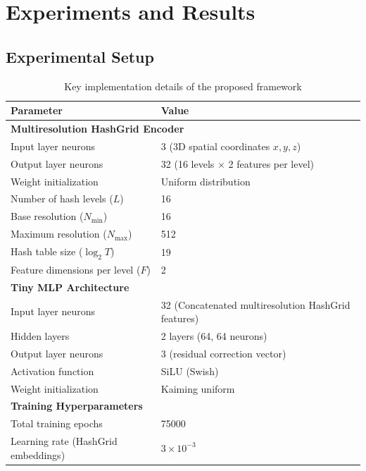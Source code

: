 \documentclass[%
 aip,
 amsmath,amssymb,
 reprint,%
nobibnotes,
]{revtex4-1}
\begin{document}
\section{\label{sec:level2}Experiments and Results}

\subsection{\label{sec:level2-1}Experimental Setup}

\begin{table}[t]
    \centering
    \caption{Key implementation details of the proposed framework}
    \label{tab:hyperparameters}
    \begin{tabular}{ll}
        \toprule
        \textbf{Parameter} & \textbf{Value} \\
        \midrule
        \multicolumn{2}{l}{\textbf{Multiresolution HashGrid Encoder}} \\
        Input layer neurons & 3 (3D spatial coordinates $x, y, z$)\\
        Output layer neurons & 32 (16 levels $\times$ 2 features per level)\\
        Weight initialization & Uniform distribution\\
        Number of hash levels ($L$) & 16 \\
        Base resolution ($N_{\min}$) & 16 \\
        Maximum resolution ($N_{\max}$) & 512 \\
        Hash table size ($\log_2 T$) & 19 \\
        Feature dimensions per level ($F$) & 2 \\
        \midrule
        \multicolumn{2}{l}{\textbf{Tiny MLP Architecture}} \\
        Input layer neurons&32 (Concatenated multiresolution HashGrid features)\\
        Hidden layers& 2 layers (64, 64 neurons)\\
        Output layer neurons& 3 (residual correction vector)\\
        Activation function & SiLU (Swish)\\
        Weight initialization& Kaiming uniform \\
        \midrule
        \multicolumn{2}{l}{\textbf{Training Hyperparameters}} \\
        Total training epochs & 75000 \\
        Learning rate (HashGrid embeddings) & $3 \times 10^{-3}$ \\

\end{tabular}
\end{table}
\end{document}
